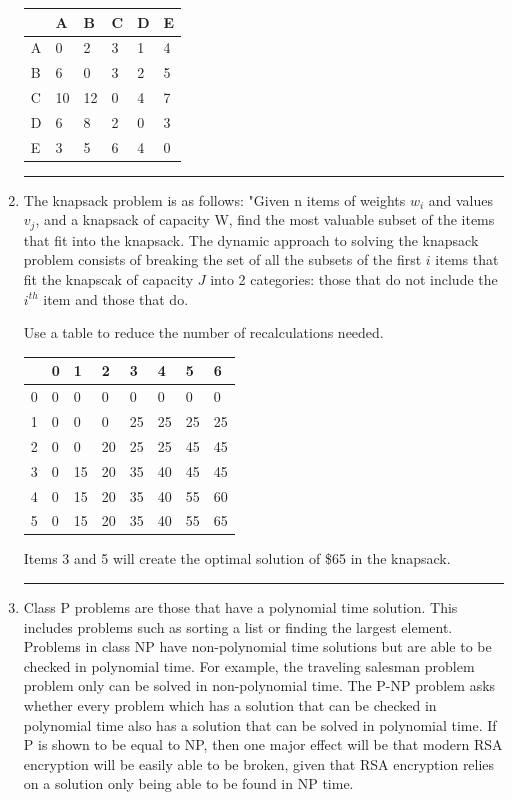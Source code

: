 \documentclass{article}
\begin{document}
\begin{enumerate}
\begin{table}[H]
\begin{tabular}{|l|l|l|l|l|l|}
\hline
 & A & B & C & D & E \\ \hline
A & 0 & 2 & 3 & 1 & 4 \\ \hline
B & 6 & 0 & 3 & 2 & 5 \\ \hline
C & 10 & 12 & 0 & 4 & 7 \\ \hline
D & 6 & 8 & 2 & 0 & 3 \\ \hline
E & 3 & 5 & 6 & 4 & 0 \\ \hline
\end{tabular}
\end{table}



\noindent\rule{8cm}{0.4pt}

\item The knapsack problem is as follows: "Given n items of weights $w_i$ and values $v_j$, and a knapsack of capacity W, find the most valuable subset of the items that fit into the knapsack. The dynamic approach to solving the knapsack problem consists of breaking the set of all the subsets of the first $i$ items that fit the knapscak of capacity $J$ into 2 categories: those that do not include the $i^{th}$ item and those that do. 

Use a table to reduce the number of recalculations needed.

\begin{table}[H]
\begin{tabular}{|l|l|l|l|l|l|l|l|}
\hline
 & 0 & 1 & 2 & 3 & 4 & 5 & 6 \\ \hline
0 & 0 & 0 & 0 & 0 & 0 & 0 & 0 \\ \hline
1 & 0 & 0 & 0 & 25 & 25 & 25 & 25 \\ \hline
2 & 0 & 0 & 20 & 25 & 25 & 45 & 45 \\ \hline
3 & 0 & 15 & 20 & 35 & 40 & 45 & 45 \\ \hline
4 & 0 & 15 & 20 & 35 & 40 & 55 & 60 \\ \hline
5 & 0 & 15 & 20 & 35 & 40 & 55 & 65 \\ \hline
\end{tabular}
\end{table}

Items 3 and 5 will create the optimal solution of \$65 in the knapsack. 

\noindent\rule{8cm}{0.4pt}

\item Class P problems are those that have a polynomial time solution. This includes problems such as sorting a list or finding the largest element. Problems in class NP have non-polynomial time solutions but are able to be checked in polynomial time. For example, the traveling salesman problem problem only can be solved in non-polynomial time. The P-NP problem asks whether every problem which has a solution that can be checked in polynomial time also has a solution that can be solved in polynomial time. If P is shown to be equal to NP, then one major effect will be that modern RSA encryption will be easily able to be broken, given that RSA encryption relies on a solution only being able to be found in NP time. 


\end{enumerate}
\end{document}
